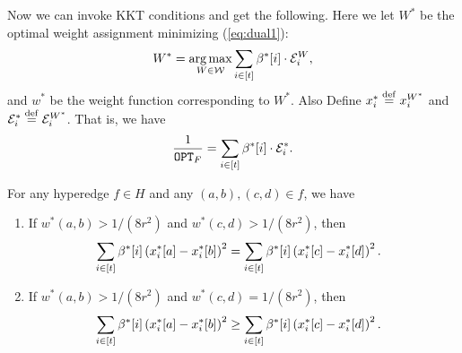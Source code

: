 \documentclass{article}
\begin{document}
Now we can invoke KKT conditions and get the following.
Here we let $W^*$ be the optimal weight assignment minimizing (\ref{eq:dual1}):
\begin{align*}
    W^* =
    \operatorname*{arg\,max}_{W\in\mathcal{W}} 
    \sum_{i\in[t]} \beta^*[i] \cdot \mathcal{E}_i^{W},
\end{align*}
and $w^*$ be the weight function corresponding to $W^*$.
Also Define $x_i^* \stackrel{\mathrm{def}}{=} x_i^{W^*}$ and
$\mathcal{E}_i^* \stackrel{\mathrm{def}}{=} \mathcal{E}_i^{W^*}$.
That is, we have
\begin{align}\label{eq:dual2}
    \frac{1}{\mathtt{OPT}_F} = 
    \sum_{i\in[t]} \beta^*[i] \cdot \mathcal{E}_i^*.
\end{align}

\begin{proposition}
\label{prop:optimality}
For any hyperedge $f\in H$ and
any $(a,b),(c,d) \in f$, we have
\begin{enumerate}
    \item If $w^*(a,b) > 1/(8r^2)$ and $w^*(c,d) > 1/(8r^2)$, then
    \begin{align}
        & \sum_{i\in [t]} \beta^*[i] \left(x_{i}^{*}[a] - x_{i}^{*}[b]\right)^2
        =
        \sum_{i\in[t]} \beta^*[i] \left(x_{i}^{*}[c] - x_{i}^{*}[d]\right)^2.
    \end{align}
    \item If $w^*(a,b) > 1/(8r^2)$ and $w^*(c,d) = 1/(8r^2)$, then
    \begin{align}
        & \sum_{i\in[t]} \beta^*[i] \left(x_{i}^{*}[a] - x_{i}^{*}[b]\right)^2 \geq
        \sum_{i\in[t]} \beta^*[i] \left(x_{i}^{*}[c] - x_{i}^{*}[d]\right)^2.
    \end{align}
\end{enumerate}
\end{proposition}
\end{document}
